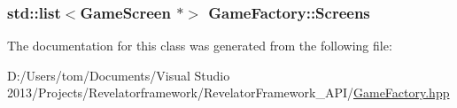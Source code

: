 \hypertarget{class_game_factory_a16a8135f6d6b1b60c0d08b39340b34cc}{
\subsubsection[{Screens}]{\setlength{\rightskip}{0pt plus 5cm}std\-::list$<${\bf Game\-Screen} $\ast$$>$ Game\-Factory\-::\-Screens\hspace{0.3cm}{\ttfamily [private]}}}\label{class_game_factory_a16a8135f6d6b1b60c0d08b39340b34cc}


The documentation for this class was generated from the following file\-:\begin{DoxyCompactItemize}
\item 
D\-:/\-Users/tom/\-Documents/\-Visual Studio 2013/\-Projects/\-Revelatorframework/\-Revelator\-Framework\-\_\-\-A\-P\-I/\hyperlink{_game_factory_8hpp}{Game\-Factory.\-hpp}\end{DoxyCompactItemize}
